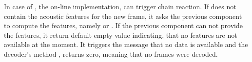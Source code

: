 In case of , the on-line implementation, can trigger chain reaction.
If  does not contain the acoustic features for the new frame, it asks
the previous component to compute the features, namely  or .
If the previous component can not provide the features, it return default empty value indicating,
that no features are not available at the moment. It triggers the message that no data is available
and the decoder's method , returns zero, meaning that no frames were decoded.



% 

